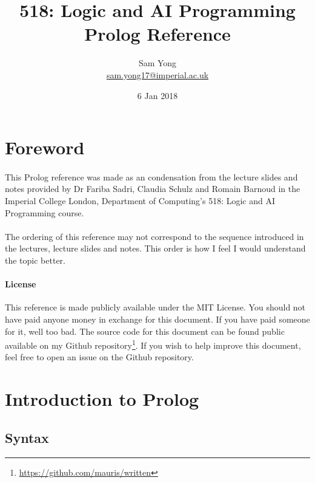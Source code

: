 \documentclass{article}
\title{
	 \large 518: Logic and AI Programming \\
	 \huge Prolog Reference
}
\date{6 Jan 2018}
\author{
	Sam Yong \\
	\small \href{mailto:sam.yong17@imperial.ac.uk}{sam.yong17@imperial.ac.uk}
}
\begin{document}
  \maketitle
  
  \begin{multicols}{2}
  
  \section*{Foreword}  
  
  \paragraph{} This Prolog reference was made as an condensation from the lecture slides and notes provided by Dr Fariba Sadri, Claudia Schulz and Romain Barnoud in the Imperial College London, Department of Computing's 518: Logic and AI Programming course.
  
  \paragraph{} The ordering of this reference may not correspond to the sequence introduced in the lectures, lecture slides and notes. This order is how I feel I would understand the topic better.
  
  \begin{footnotesize}
  \paragraph{License} This reference is made publicly available under the MIT License. You should not have paid anyone money in exchange for this document. If you have paid someone for it, well too bad. The source code for this document can be found public available on my Github repository\footnote{\href{https://github.com/mauris/written}{https://github.com/mauris/written}}. If you wish to help improve this document, feel free to open an issue on the Github repository.
  \end{footnotesize}
  
  \tableofcontents
  
  \newpage
  
  \section{Introduction to Prolog}
  
  \subsection{Syntax}
  

\end{multicols}
\end{document}
